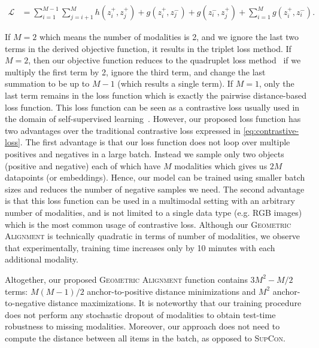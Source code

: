 \documentclass[10pt]{article} %
\newcommand{\geom}{\textsc{Geometric Alignment}}
\newcommand{\supcon}{\textsc{SupCon}}
\begin{document}
\begin{equation}\label{eq:objective-geom-rewritten}
\begin{split}
     \mathcal{L} &= \sum_{i=1}^{M-1} \sum_{j=i+1}^{M} h( z_{i}^{+} , z_{j}^{+})
     + g( z_{i}^{+} , z_{j}^{-}) + g( z_{i}^{-} , z_{j}^{+}) + \sum_{i=1}^{M} g( z_{i}^{+} , z_{i}^{-} ).
\end{split}
\end{equation}



If $M=2$ which means the number of modalities is 2, and we ignore the last two terms in the derived objective function, it results in the triplet loss method. 
If $M=2$, then our objective function reduces to the quadruplet loss method~\citep{tursun2021efficient,chen2017beyond} if we multiply the first term by 2, ignore the third term, and change the last summation to be up to $M-1$ (which results a single term). 
If $M=1$, only the last term remains in the loss function which is exactly the pairwise distance-based loss function.
This loss function can be seen as a contrastive loss usually used in the domain of self-supervised learning~\citep{chen2020simple}. However, our proposed loss function has two advantages over the traditional contrastive loss expressed in \cref{eq:contrastive-loss}. The first advantage is that our loss function does not loop over multiple positives and negatives in a large batch. Instead we sample only two objects (positive and negative) each of which have $M$ modalities which gives us $2M$ datapoints (or embeddings). Hence, our model can be trained using smaller batch sizes and reduces the number of negative samples we need. The second advantage is that this loss function can be used in a multimodal setting with an arbitrary number of modalities, and is not limited to a single data type (e.g. RGB images) which is the most common usage of contrastive loss.
Although our \geom{} is technically quadratic in terms of number of modalities, we observe that experimentally, training time increases only by 10 minutes with each additional modality.


Altogether, our proposed \geom{} function contains 
$3M^2-M/2$ terms: 
$M(M-1)/2$ anchor-to-positive distance minimizations and $M^2$ anchor-to-negative distance maximizations.
It is noteworthy that our training procedure does not perform any stochastic dropout of modalities to obtain test-time robustness to missing modalities. Moreover, our approach does not need to compute the distance between all items in the batch, as opposed to \supcon{}.
\end{document}

